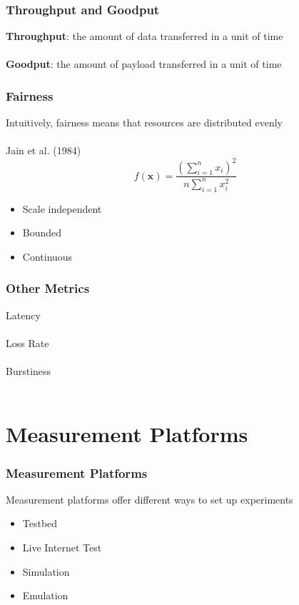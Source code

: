 \documentclass{beamer}
\begin{document}
\begin{frame}
\frametitle{Throughput and Goodput}
\textbf{Throughput}: the amount of data transferred in a unit of time\\~\\

\textbf{Goodput}: the amount of payload transferred in a unit of time
\end{frame}

\begin{frame}
\frametitle{Fairness}
Intuitively, fairness means that resources are distributed evenly\\~\\

Jain et al. (1984)
\begin{equation*}
f(\textbf{x}) = \frac{ \left(\sum\limits_{i=1}^{n} x_i\right)^2 }{n \sum\limits_{i=1}^{n} x_i^2 } 
\end{equation*}

\begin{itemize}
	\item Scale independent
	\item Bounded
	\item Continuous
\end{itemize}

\end{frame}

\begin{frame}
\frametitle{Other Metrics}

Latency\\~\\

Loss Rate\\~\\

Burstiness\\~\\

\end{frame}

\section{Measurement Platforms}

\begin{frame}
\frametitle{Measurement Platforms}

Measurement platforms offer different ways to set up experiments

\begin{itemize}
	\item Testbed
	\item Live Internet Test
	\item Simulation
	\item Emulation
\end{itemize}
\end{frame}
\end{document}
